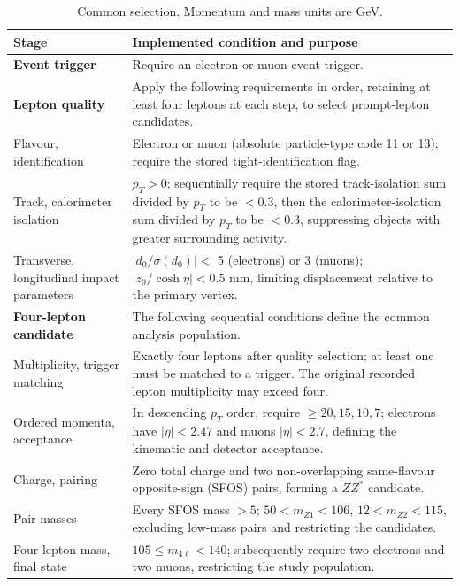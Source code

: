 \documentclass[11pt,a4paper]{article}
\begin{document}
\begin{table}[!htbp]
\caption{Common selection. Momentum and mass units are GeV.}
\label{tab:cuts}
\centering\small
\renewcommand{\arraystretch}{1.1}
\begin{tabularx}{\linewidth}{@{}>{\raggedright\arraybackslash}p{.23\linewidth}Y@{}}
\toprule
Stage & Implemented condition and purpose \\
\midrule
\textbf{Event trigger} & Require an electron or muon event trigger. \\
\midrule
\textbf{Lepton quality} & Apply the following requirements in order, retaining at least four leptons at each step, to select prompt-lepton candidates. \\
Flavour, identification & Electron or muon (absolute particle-type code 11 or 13); require the stored tight-identification flag. \\
Track, calorimeter isolation & $p_T>0$; sequentially require the stored track-isolation sum divided by $p_T$ to be $<0.3$, then the calorimeter-isolation sum divided by $p_T$ to be $<0.3$, suppressing objects with greater surrounding activity. \\
Transverse, longitudinal impact parameters & $|d_0/\sigma(d_0)|<$ 5 (electrons) or 3 (muons);
$|z_0/\cosh\eta|<0.5$ mm, limiting displacement relative to the primary vertex. \\
\midrule
\textbf{Four-lepton candidate} & The following sequential conditions define the common analysis population. \\
Multiplicity, trigger matching & Exactly four leptons after quality selection; at least one must be matched to a trigger.
The original recorded lepton multiplicity may exceed four. \\
Ordered momenta, acceptance & In descending $p_T$ order, require $\geq20,15,10,7$;
electrons have $|\eta|<2.47$ and muons $|\eta|<2.7$, defining the kinematic and detector acceptance. \\
Charge, pairing & Zero total charge and two non-overlapping same-flavour opposite-sign (SFOS) pairs, forming a $ZZ^*$ candidate. \\
Pair masses & Every SFOS mass $>5$; $50<m_{Z1}<106$, $12<m_{Z2}<115$, excluding low-mass pairs and restricting the candidates. \\
Four-lepton mass, final state & $105\leq m_{4\ell}<140$; subsequently require two electrons and two muons, restricting the study population. \\
\bottomrule
\end{tabularx}
\end{table}
\end{document}
